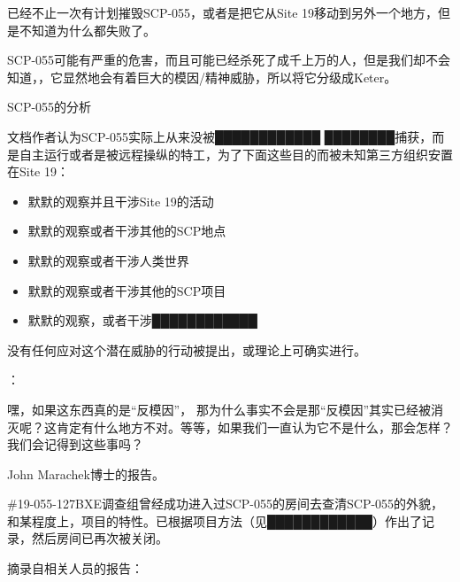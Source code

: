 已经不止一次有计划摧毁SCP-055，或者是把它从Site 19移动到另外一个地方，但是不知道为什么都失败了。

SCP-055可能有严重的危害，而且可能已经杀死了成千上万的人，但是我们却不会知道，，它显然地会有着巨大的模因\slash 精神威胁，所以将它分级成Keter。

SCP-055的分析

文档作者认为SCP-055实际上从来没被████████████ ████████捕获，而是自主运行或者是被远程操纵的特工，为了下面这些目的而被未知第三方组织安置在Site 19：

\begin{itemize}
\item 默默的观察并且干涉Site 19的活动
\item 默默的观察或者干涉其他的SCP地点
\item 默默的观察或者干涉人类世界
\item 默默的观察或者干涉其他的SCP项目
\item 默默的观察，或者干涉████████████
\end{itemize}

没有任何应对这个潜在威胁的行动被提出，或理论上可确实进行。

：

\begin{scpbox}

嘿，如果这东西真的是“反模因”， 那为什么事实不会是那“反模因”其实已经被消灭呢？这肯定有什么地方不对。等等，如果我们一直认为它不是什么，那会怎样？我们会记得到这些事吗？

\end{scpbox}

John Marachek博士的报告。

\#19-055-127BXE调查组曾经成功进入过SCP-055的房间去查清SCP-055的外貌，和某程度上，项目的特性。已根据项目方法（见████████████）作出了记录，然后房间已再次被关闭。

摘录自相关人员的报告：

